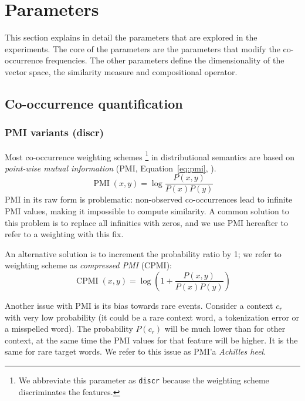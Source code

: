 \section{Parameters}
\label{sec:parameters}

This section explains in detail the parameters that are explored in the experiments. The core of the parameters are the parameters that modify the co-occurrence frequencies. The other parameters define the dimensionality of the vector space, the similarity measure and compositional operator.

\subsection{Co-occurrence quantification}
\label{sec:quantification}

\subsubsection{PMI variants (discr)}
\label{sec:pmi-variants}

Most co-occurrence weighting schemes%
\footnote{We abbreviate this parameter as \texttt{discr} because the weighting scheme discriminates the features.
}
in distributional semantics are based on \emph{point-wise mutual information} (PMI, Equation~\ref{eq:pmi}, ).
%
\begin{equation}
  \label{eq:pmi}
  \operatorname{PMI}(x, y) = \log\frac{P(x,y)}{P(x)P(y)}
\end{equation}
%
PMI in its raw form is problematic: non-observed co-occurrences lead to infinite PMI values, making it impossible to compute similarity. A common solution to this problem is to replace all infinities with zeros, and we use PMI hereafter to refer to a weighting with this fix.

An alternative solution is to increment the probability ratio by 1; we refer to weighting scheme as \emph{compressed PMI} (CPMI):
%
\begin{equation}
  \label{eq:cpmi}
  \operatorname{CPMI}(x, y) = \log\left( 1 +  \frac{P(x,y)}{P(x)P(y)} \right)
\end{equation}

Another issue with PMI is its bias towards rare events. Consider a context $c_r$  with very low probability (it could be a rare context word, a tokenization error or a misspelled word). The probability $P(c_r)$ will be much lower than for other context, at the same time the PMI values for that feature will be higher. It is the same for rare target words. We refer to this issue as PMI'a \textit{Achilles heel}.

